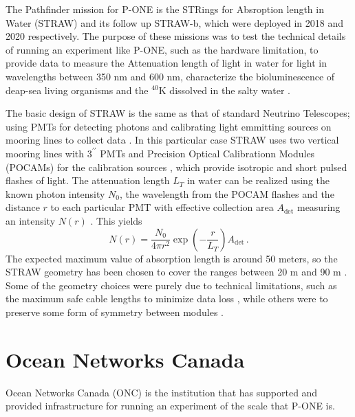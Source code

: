The Pathfinder mission for P-ONE is the STRings for Absroption length in Water (STRAW) and its follow up STRAW-b, which were deployed in 2018 and 2020 respectively. The purpose of these missions was to test the technical details of running an experiment like P-ONE, such as the hardware limitation, to provide data to measure the Attenuation length of light in water for light in wavelengths between 350 nm and 600 nm, characterize the bioluminescence of deap-sea living organisms and the $^{40}$K dissolved in the salty water \cite{straw}.

The basic design of STRAW is the same as that of standard Neutrino Telescopes; using PMTs for detecting photons and calibrating light emmitting sources on mooring lines to collect data \cite{straw}. In this particular case STRAW uses two vertical mooring lines with $3^{\prime\prime}$ PMTs and Precision Optical Calibrationn Modules (POCAMs) for the calibration sources \cite{straw}, which provide isotropic and short pulsed flashes of light. The attenuation length $L_{T}$ in water can be realized using the known photon intensity $N_{0}$, the wavelength from the POCAM flashes and the distance $r$ to each particular PMT with effective collection area $A_{\text{det}}$ measuring an intensity $N(r)$ \cite{straw}. This yields
\begin{equation}
  N(r) = \frac{N_{0}}{4\pi r^{2}}\exp\left(-\frac{r}{L_{T}}\right)A_{\text{det}}\, .
\end{equation}
The expected maximum value of absorption length is around 50 meters, so the STRAW geometry has been chosen to cover the ranges between 20 m and 90 m \cite{straw}. Some of the geometry choices were purely due to technical limitations, such as the maximum safe cable lengths to minimize data loss \cite{straw}, while others were to preserve some form of symmetry between modules \cite{straw}. 


\section{Ocean Networks Canada}

Ocean Networks Canada (ONC) is the institution that has supported and provided infrastructure for running an experiment of the scale that P-ONE is. 


